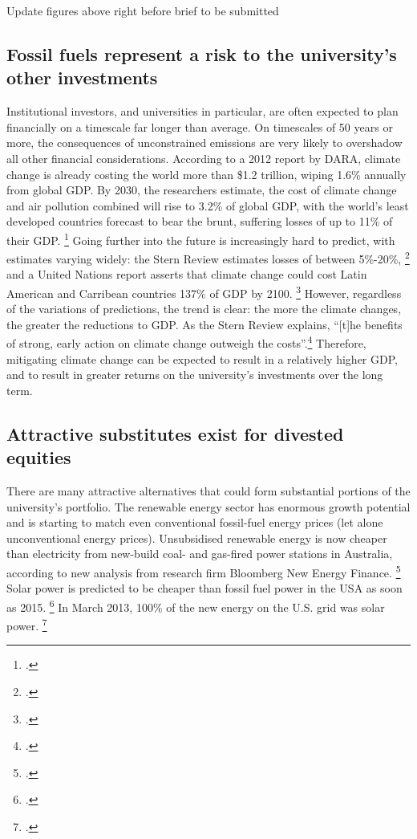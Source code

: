 \begin{vcom}
Update figures above right before brief to be submitted
\end{vcom}



	\subsection {Fossil fuels represent a risk to the university's other investments}



Institutional investors, and universities in particular, are often expected to plan financially on a timescale far longer than average. 
On timescales of 50 years or more, the consequences of unconstrained emissions are very likely to overshadow all other financial considerations.
According to a 2012 report by DARA, climate change is already costing the world more than \$1.2 trillion, wiping 1.6\% annually from global GDP.
By 2030, the researchers estimate, the cost of climate change and air pollution combined will rise to 3.2\% of global GDP, with the world's least developed countries forecast to bear the brunt, suffering losses of up to 11\% of their GDP. \footcite{DARACVM}
Going further into the future is increasingly hard to predict, with estimates varying widely: the Stern Review estimates losses of between 5\%-20\%, \footcite{Stern2007} and a United Nations report asserts that climate change could cost Latin American and Carribean countries 137\% of GDP by 2100. \footcite{CCLatinAmerica}
However, regardless of the variations of predictions, the trend is clear: the more the climate changes, the greater the reductions to GDP.
As the Stern Review explains, ``[t]he benefits of strong, early action on climate change outweigh the costs''.\footcite[][Executive summary at: \url{http://www.hm-treasury.gov.uk/d/Executive_Summary.pdf}]{Stern2007}
Therefore, mitigating climate change can be expected to result in a relatively higher GDP, and to result in greater returns on the university's investments over the long term.



	\subsection {Attractive substitutes exist for divested equities}



There are many attractive alternatives that could form substantial portions of the university's portfolio.
The renewable energy sector has enormous growth potential and is starting to match even conventional fossil-fuel energy prices (let alone unconventional energy prices).
Unsubsidised renewable energy is now cheaper than electricity from new-build coal- and gas-fired power stations in Australia, according to new analysis from research firm Bloomberg New Energy Finance. \footcite{BlombergAussieWind}
Solar power is predicted to be cheaper than fossil fuel power in the USA as soon as 2015. \footcite{GlobalDataSolar}
In March 2013, 100\% of the new energy on the U.S. grid was solar power. \footcite{SmartPlanetSolar100}



